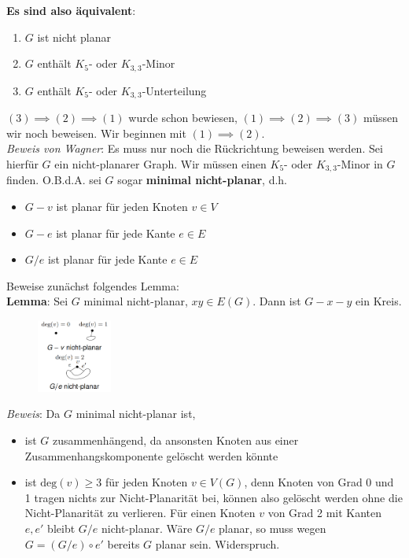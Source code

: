 \textbf{Es sind also äquivalent}:
\begin{enumerate}
	\item $G$ ist nicht planar
	\item $G$ enthält $K_5$- oder $K_{3,3}$-Minor
	\item $G$ enthält $K_5$- oder $K_{3,3}$-Unterteilung
\end{enumerate}

$(3)\implies(2)\implies(1)$ wurde schon bewiesen, $(1)\implies(2)\implies(3)$ müssen wir noch beweisen. Wir beginnen mit $(1)\implies(2)$.\\

\textit{Beweis von Wagner}: Es muss nur noch die Rückrichtung beweisen werden. Sei hierfür $G$ ein nicht-planarer Graph. Wir müssen einen $K_5$- oder $K_{3,3}$-Minor in $G$ finden. O.B.d.A. sei $G$ sogar \textbf{minimal nicht-planar}, d.h.
\begin{itemize}
	\item $G-v$ ist planar für jeden Knoten $v\in V$
	\item $G-e$ ist planar für jede Kante $e\in E$
	\item $G/e$ ist planar für jede Kante $e\in E$
\end{itemize}

Beweise zunächst folgendes Lemma:\\

\textbf{Lemma}: Sei $G$ minimal nicht-planar, $xy\in E(G)$. Dann ist $G-x-y$ ein Kreis.

\begin{figure}
	\centering
	\vspace{30pt}
	\includegraphics[width=0.22\textwidth]{images/wagner-1.png}
	\vspace{40pt}
	\vspace{-80pt}
\end{figure}
\textit{Beweis}: Da $G$ minimal nicht-planar ist,
\begin{itemize}
	\item ist $G$ zusammenhängend, da ansonsten Knoten aus einer Zusammenhangskomponente gelöscht werden könnte
	\item ist $\text{deg}(v)\geq 3$ für jeden Knoten $v\in V(G)$, denn Knoten von Grad 0 und 1 tragen nichts zur Nicht-Planarität bei, können also gelöscht werden ohne die Nicht-Planarität zu verlieren. Für einen Knoten $v$ von Grad 2 mit Kanten $e, e'$ bleibt $G/e$ nicht-planar. Wäre $G/e$ planar, so muss wegen $G = (G/e) \circ e'$ bereits $G$ planar sein. Widerspruch.
\end{itemize}

